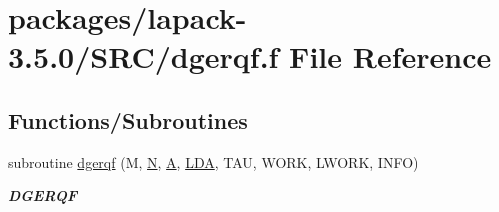 \hypertarget{dgerqf_8f}{}\section{packages/lapack-\/3.5.0/\+S\+R\+C/dgerqf.f File Reference}
\label{dgerqf_8f}
\subsection*{Functions/\+Subroutines}
\begin{DoxyCompactItemize}
\item 
subroutine \hyperlink{group__doubleGEcomputational_ga7bba0d791b011eb5425ecbf500e9be2c}{dgerqf} (M, \hyperlink{polmisc_8c_a0240ac851181b84ac374872dc5434ee4}{N}, \hyperlink{classA}{A}, \hyperlink{example__user_8c_ae946da542ce0db94dced19b2ecefd1aa}{L\+D\+A}, T\+A\+U, W\+O\+R\+K, L\+W\+O\+R\+K, I\+N\+F\+O)
\begin{DoxyCompactList}\small\item\em {\bfseries D\+G\+E\+R\+Q\+F} \end{DoxyCompactList}\end{DoxyCompactItemize}
